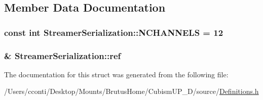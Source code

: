 \subsection{Member Data Documentation}
\hypertarget{struct_streamer_serialization_af9222eefb63c0950780e679dcf2b8bd8}{}
\subsubsection[{N\+C\+H\+A\+N\+N\+E\+L\+S}]{\setlength{\rightskip}{0pt plus 5cm}const int Streamer\+Serialization\+::\+N\+C\+H\+A\+N\+N\+E\+L\+S = 12\hspace{0.3cm}{\ttfamily [static]}}\label{struct_streamer_serialization_af9222eefb63c0950780e679dcf2b8bd8}
\hypertarget{struct_streamer_serialization_ae6cac83de60e767381f52da8c0c396db}{}
\subsubsection[{ref}]{\& Streamer\+Serialization\+::ref}\label{struct_streamer_serialization_ae6cac83de60e767381f52da8c0c396db}


The documentation for this struct was generated from the following file\+:\begin{DoxyCompactItemize}
\item 
/\+Users/cconti/\+Desktop/\+Mounts/\+Brutus\+Home/\+Cubism\+U\+P\+\_\+D/source/\hyperlink{_definitions_8h}{Definitions.\+h}\end{DoxyCompactItemize}
